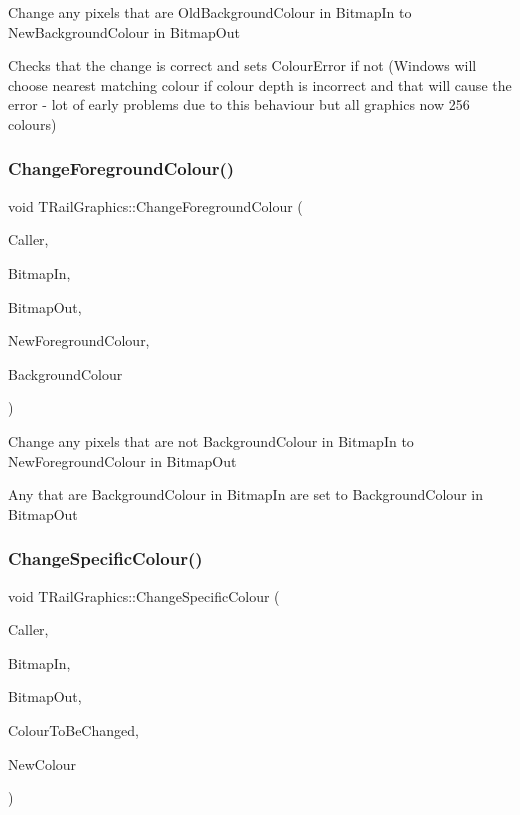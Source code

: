 Change any pixels that are Old\+Background\+Colour in Bitmap\+In to New\+Background\+Colour in Bitmap\+Out

Checks that the change is correct and sets Colour\+Error if not (Windows will choose nearest matching colour if colour depth is incorrect and that will cause the error -\/ lot of early problems due to this behaviour but all graphics now 256 colours) \mbox{\label{class_t_rail_graphics_aa2dace651659e084ec23c9961f5819b1}} 
\subsubsection{\texorpdfstring{Change\+Foreground\+Colour()}{ChangeForegroundColour()}}
{\footnotesize\ttfamily void T\+Rail\+Graphics\+::\+Change\+Foreground\+Colour (\begin{DoxyParamCaption}\item[{int}]{Caller,  }\item[{Graphics\+::\+T\+Bitmap $\ast$}]{Bitmap\+In,  }\item[{Graphics\+::\+T\+Bitmap $\ast$}]{Bitmap\+Out,  }\item[{T\+Color}]{New\+Foreground\+Colour,  }\item[{T\+Color}]{Background\+Colour }\end{DoxyParamCaption})}

Change any pixels that are not Background\+Colour in Bitmap\+In to New\+Foreground\+Colour in Bitmap\+Out

Any that are Background\+Colour in Bitmap\+In are set to Background\+Colour in Bitmap\+Out \mbox{\label{class_t_rail_graphics_ac4e48e6ee19e01724adb0d490762d548}} 
\subsubsection{\texorpdfstring{Change\+Specific\+Colour()}{ChangeSpecificColour()}}
{\footnotesize\ttfamily void T\+Rail\+Graphics\+::\+Change\+Specific\+Colour (\begin{DoxyParamCaption}\item[{int}]{Caller,  }\item[{Graphics\+::\+T\+Bitmap $\ast$}]{Bitmap\+In,  }\item[{Graphics\+::\+T\+Bitmap $\ast$}]{Bitmap\+Out,  }\item[{T\+Color}]{Colour\+To\+Be\+Changed,  }\item[{T\+Color}]{New\+Colour }\end{DoxyParamCaption})}

